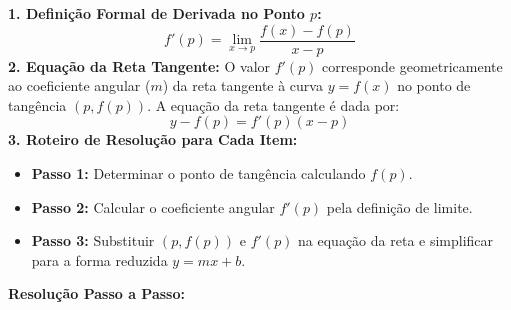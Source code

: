 \documentclass[12pt,a4paper]{article}
\begin{document}
\begin{recursosbox}[title=Estratégia Geral e Recursos Algébricos]
\textbf{1. Definição Formal de Derivada no Ponto $p$:}
\[
f'(p) = \lim_{x \to p} \frac{f(x) - f(p)}{x - p}
\]
\textbf{2. Equação da Reta Tangente:}
O valor $f'(p)$ corresponde geometricamente ao coeficiente angular ($m$) da reta tangente à curva $y = f(x)$ no ponto de tangência $(p, f(p))$. A equação da reta tangente é dada por:
\[
y - f(p) = f'(p)(x - p)
\]
\textbf{3. Roteiro de Resolução para Cada Item:}
\begin{itemize}[noitemsep, topsep=2pt]
    \item \textbf{Passo 1:} Determinar o ponto de tangência calculando $f(p)$.
    \item \textbf{Passo 2:} Calcular o coeficiente angular $f'(p)$ pela definição de limite.
    \item \textbf{Passo 3:} Substituir $(p, f(p))$ e $f'(p)$ na equação da reta e simplificar para a forma reduzida $y = mx + b$.
\end{itemize}
\end{recursosbox}

\vspace{0.4cm}
\textbf{Resolução Passo a Passo:}
\end{document}
